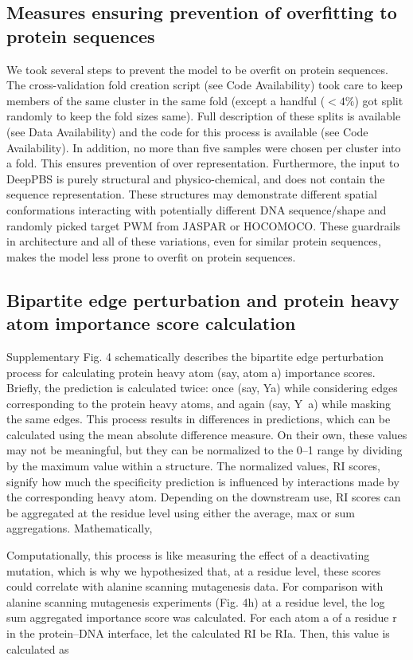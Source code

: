 \subsection{Measures ensuring prevention of overfitting to protein sequences}
We took several steps to prevent the model to be overfit on protein sequences. The cross-validation fold creation script (see Code Availability) took care to keep members of the same cluster in the same fold (except a handful ($<4\%$) got split randomly to keep the fold sizes same). Full description of these splits is available (see Data Availability) and the code for this process is available (see Code Availability). In addition, no more than five samples were chosen per cluster into a fold. This ensures prevention of over representation. Furthermore, the input to DeepPBS is purely structural and physico-chemical, and does not contain the sequence representation. These structures may demonstrate different spatial conformations interacting with potentially different DNA sequence/shape and randomly picked target PWM from JASPAR or HOCOMOCO. These guardrails in architecture and all of these variations, even for similar protein sequences, makes the model less prone to overfit on protein sequences. 
\\
\subsection{Bipartite edge perturbation and protein heavy atom importance score calculation}
Supplementary Fig. 4 schematically describes the bipartite edge perturbation process for calculating protein heavy atom (say, atom a) importance scores. Briefly, the prediction is calculated twice: once (say, Ya) while considering edges corresponding to the protein heavy atoms, and again (say, Y~a) while masking the same edges. This process results in differences in predictions, which can be calculated using the mean absolute difference measure. On their own, these values may not be meaningful, but they can be normalized to the 0–1 range by dividing by the maximum value within a structure. The normalized values, RI scores, signify how much the specificity prediction is influenced by interactions made by the corresponding heavy atom. Depending on the downstream use, RI scores can be aggregated at the residue level using either the average, max or sum aggregations. Mathematically,
\par
Computationally, this process is like measuring the effect of a deactivating mutation, which is why we hypothesized that, at a residue level, these scores could correlate with alanine scanning mutagenesis data. For comparison with alanine scanning mutagenesis experiments (Fig. 4h) at a residue level, the log sum aggregated importance score was calculated. For each atom a of a residue r in the protein–DNA interface, let the calculated RI be RIa. Then, this value is calculated as 


